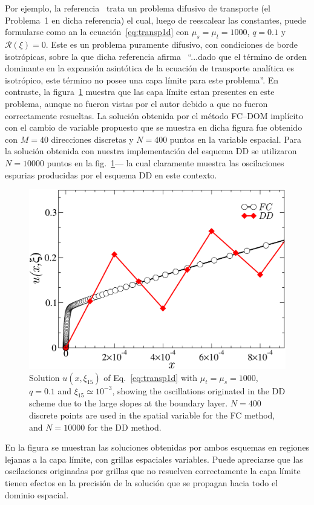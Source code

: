 Por ejemplo, la referencia~\cite{Larsen1987} trata un problema 
difusivo de transporte (el Problema~1 en dicha referencia) 
el cual, luego de reescalear las constantes, puede formularse 
como an la ecuación~\eqref{eq:transp1d} con $\mu_s=\mu_t=1000$,
 $q=0.1$ y $\mathcal{R}(\xi)=0$. Este es un problema 
 puramente difusivo, con condiciones de borde isotrópicas, 
 sobre la que dicha referencia afirma~\cite[pp. 317]{Larsen1987} 
 ``...dado que el término de orden dominante en la expansión asintótica 
 de la ecuación de transporte analítica es isotrópico, 
 este término no posee una capa límite para este problema''. 
 En contraste, la figura~\ref{fig:DDlayer} muestra que 
 las capa límite estan presentes en este problema, aunque 
 no fueron vistas por el autor debido a que no fueron correctamente 
 resueltas. La solución obtenida por el método FC--DOM implícito 
 con el cambio de variable propuesto que se muestra en dicha figura 
 fue obtenido con $M=40$ direcciones discretas y $N=400$ puntos 
 en la variable espacial. Para la solución obtenida con nuestra implementación 
 del esquema DD se utilizaron $N=10000$ puntos en la fig.~\ref{fig:DDlayer}---
 la cual claramente muestra las oscilaciones espurias producidas 
 por el esquema DD en este contexto.
\begin{figure}[h!]
\centering
  \includegraphics[width=0.5\linewidth]{figuras/layerlar.pdf}
  \caption{Solution $u(x,\xi_{15})$ of Eq.~\eqref{eq:transp1d} with 
$\mu_t=\mu_s=1000$, $q=0.1$ and $\xi_{\text{15}} \simeq 10^{-3}$, showing 
the oscillations originated in the DD scheme due to the large slopes 
at the boundary layer. 
$N=400$ discrete points are used in the spatial variable for the FC method, 
and $N=10000$ for the DD method.}
 \label{fig:DDlayer}
\end{figure}
En la figura se muestran las soluciones obtenidas por ambos esquemas 
en regiones lejanas a la capa límite, con grillas espaciales variables. 
Puede apreciarse que las oscilaciones originadas por grillas que 
no resuelven correctamente la capa límite tienen efectos en la 
precisión de la solución que se propagan hacia todo el dominio espacial.
